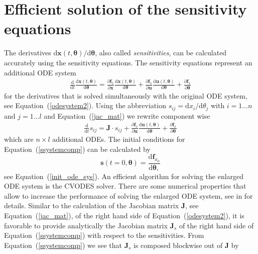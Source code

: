 \documentclass[12pt,a4paper]{scrartcl}
\newcommand{\dd}[2]{\frac{\partial #1}{\partial #2}}
\newcommand{\DD}[2]{\frac{\mathrm{d} #1}{\mathrm{d} #2}}
\begin{document}
\section{Efficient solution of the sensitivity equations} \label{sec:ode_simu}
The derivatives $\mathrm{d}\mathbf{x}(t,\boldsymbol{\theta}) / \mathrm{d} \boldsymbol{\theta}$, also called 
\emph{sensitivities}, can be calculated accurately using the sensitivity equations. The 
sensitivity equations represent an additional ODE system
\begin{eqnarray}
	\DD{}{t} \DD{\mathbf{x}(t,\boldsymbol{\theta})}{\boldsymbol{\theta}}  =  \dd{\mathbf{f}
_x}{\mathbf{x}}  \DD{\mathbf{x}(t,\boldsymbol{\theta})}{\boldsymbol{\theta}} +  
\dd{\mathbf{f}_x}{\mathbf{u}}  \DD{\mathbf{u}(t,\boldsymbol{\theta})}{\boldsymbol{\theta}} + 
\dd{\mathbf{f}_x}{\boldsymbol{\theta}} \label{ssystem2}
\end{eqnarray}
for the derivatives \citep{Leis:1988dl} that is solved simultaneously with the original ODE 
system, see Equation~(\ref{odesystem2}). Using the abbreviation $s_{ij} = \mathrm{d} x_i / \mathrm{d} \theta_j
$ with $i = 1 \dots n$ and $j = 1 \dots l$ and Equation~(\ref{jac_mat}) we rewrite 
component wise
\begin{eqnarray}
	\DD{}{t} s_{ij}  =  \mathbf{J} \cdot s_{ij} +  \dd{\mathbf{f}_x}{\mathbf{u}}  
\DD{\mathbf{u}(t,\boldsymbol{\theta})}{\boldsymbol{\theta}} + \dd{\mathbf{f}_x}
{\boldsymbol{\theta}} \label{ssystemcomp}
\end{eqnarray}
which are $n \times l$ additional ODEs. The initial conditions for 
Equation~(\ref{ssystemcomp}) can be calculated by 
\begin{equation}
	\mathbf{s}(t=0,\boldsymbol{\theta}) = \DD{\mathbf{f}_{x_0}}{\boldsymbol{\theta},}
\end{equation}
see Equation~(\ref{init_ode_sys}). An efficient algorithm for solving the enlarged ODE 
system is the CVODES solver. There are some numerical properties that allow to increase 
the performance of solving the enlarged ODE system, see in \cite{Hindmarsh:2005fb} for 
details. Similar to the calculation of the Jacobian matrix $\mathbf{J}$, see 
Equation~(\ref{jac_mat}), of the right hand side of Equation~(\ref{odesystem2}), it is 
favorable to provide analytically the Jacobian matrix $\mathbf{J}_s$ of the right hand side 
of Equation~(\ref{ssystemcomp}) with respect to the sensitivities. From 
Equation~(\ref{ssystemcomp}) we see that $\mathbf{J}_s$ is composed blockwise out of $
\mathbf{J}$ by
\end{document}
